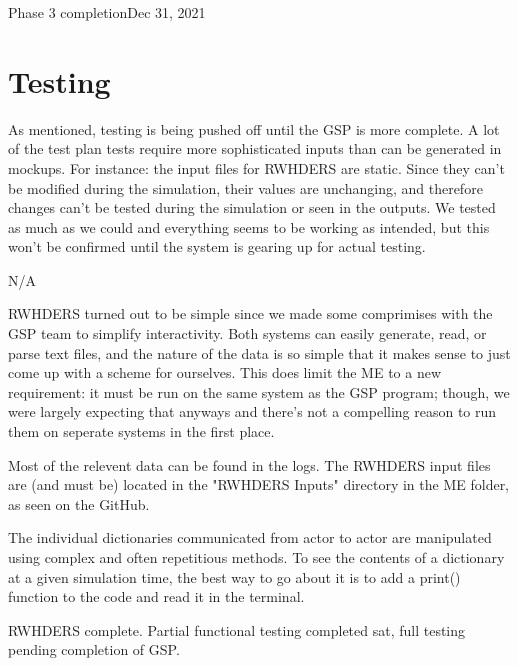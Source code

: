 \begin{entry}{Phase 3 completion}{Dec 31, 2021}
    \section*{Testing}
    As mentioned, testing is being pushed off until the GSP is more complete. A lot of the test plan tests require more
    sophisticated inputs than can be generated in mockups. For instance: the input files for RWHDERS are static. Since
    they can't be modified during the simulation, their values are unchanging, and therefore changes can't be tested
    during the simulation or seen in the outputs. We tested as much as we could and everything seems to be working as
    intended, but this won't be confirmed until the system is gearing up for actual testing.

    \parameters
    
    N/A

    \observations

    RWHDERS turned out to be simple since we made some comprimises with the GSP team to simplify interactivity. Both
    systems can easily generate, read, or parse text files, and the nature of the data is so simple that it makes sense
    to just come up with a scheme for ourselves. This does limit the ME to a new requirement: it must be run on the
    same system as the GSP program; though, we were largely expecting that anyways and there's not a compelling reason
    to run them on seperate systems in the first place.


    \data

    Most of the relevent data can be found in the logs. The RWHDERS input files are (and must be) located in the
    "RWHDERS Inputs" directory in the ME folder, as seen on the GitHub.

    The individual dictionaries communicated from actor to actor are manipulated using complex and often repetitious
    methods. To see the contents of a dictionary at a given simulation time, the best way to go about it is to add
    a print() function to the code and read it in the terminal.

    \results
    
    RWHDERS complete. Partial functional testing completed sat, full testing pending completion of GSP.


\end{entry}


